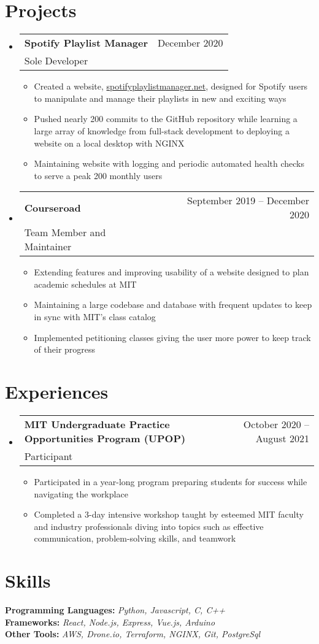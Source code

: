\documentclass[letterpaper,12pt]{article} %
\makeatletter
\newcommand{\CVItem}[1]{
  \item\small{
    {#1 \vspace{-2pt}}
  }
}
\newcommand{\CVSubheading}[4]{
  \vspace{-2pt}\item
    \begin{tabular*}{0.97\textwidth}[t]{l@{\extracolsep{\fill}}r}
      \textbf{#1} & #2 \\
      \small#3 & \small #4 \\
    \end{tabular*}\vspace{-7pt}
}
\newcommand{\CVSubHeadingListStart}{\begin{itemize}[leftmargin=0.15in, label={}]} %
\newcommand{\CVSubHeadingListEnd}{\end{itemize}}
\newcommand{\CVItemListStart}{\begin{itemize}}
\newcommand{\CVItemListEnd}{\end{itemize}\vspace{-5pt}}
\makeatother
\begin{document}
\section{Projects}
\CVSubHeadingListStart
\CVSubheading
{Spotify Playlist Manager}{December 2020}
{Sole Developer}{}
\CVItemListStart
\CVItem{Created a website, \href{www.spotifyplaylistmanaget.net}{spotifyplaylistmanager.net},
  designed for Spotify users to manipulate and manage their playlists in new and exciting ways}
\CVItem{Pushed nearly 200 commits to the GitHub repository
  while learning a large array of knowledge from full-stack development to deploying a website on a local desktop with NGINX}
\CVItem{Maintaining website with logging and periodic automated health checks to serve a peak 200 monthly users}
\CVItemListEnd
\CVSubheading
{Courseroad}{September 2019 -- December 2020}
{Team Member and Maintainer}{}
\CVItemListStart
\CVItem{Extending features and improving usability of a website designed to plan academic schedules at MIT}
\CVItem{Maintaining a large codebase and database with frequent updates to keep in sync with MIT's class catalog}
\CVItem{Implemented petitioning classes giving the user more power to keep track of their progress}
\CVItemListEnd
\CVSubHeadingListEnd
\section{Experiences}
\CVSubHeadingListStart
\CVSubheading
{MIT Undergraduate Practice Opportunities Program (UPOP)}{October 2020 -- August 2021}
{Participant}{}
\CVItemListStart
\CVItem{Participated in a year-long program preparing students for success while navigating the workplace}
\CVItem{Completed a 3-day intensive workshop taught by esteemed MIT faculty and industry professionals
  diving into topics such as effective communication, problem-solving skills, and teamwork}
\CVItemListEnd
\CVSubHeadingListEnd

\section{Skills}
\begin{itemize}[leftmargin=0.15in, label={}]
  \small{\item{
        \textbf{Programming Languages: }{\emph{Python, Javascript, C, C++}} \\
        \textbf{Frameworks: }{\emph{React, Node.js, Express, Vue.js, Arduino}}\\
        \textbf{Other Tools: }{\emph{AWS, Drone.io, Terraform, NGINX, Git, PostgreSql}} \\
        }}
\end{itemize}

\end{document}
